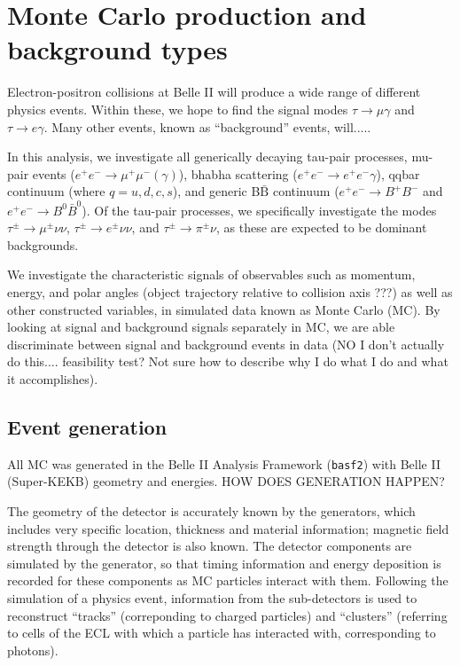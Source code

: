 \documentclass[12pt]{thesis}  %
\begin{document}

\chapter{Monte Carlo production and background types}

Electron-positron collisions at Belle II will produce a wide range of different physics events. Within these, we hope to find the signal modes $\tau\to\mu\gamma$ and $\tau\to e\gamma$. Many other events, known as ``background'' events, will.....

In this analysis, we investigate all generically decaying tau-pair processes, mu-pair events ($e^+ e^- \to \mu^+ \mu^- (\gamma)$), bhabha scattering ($e^+ e^- \to e^+ e^- \gamma$), qqbar continuum (where $q = u, d, c, s$), and generic B$\bar{\text{B}}$ continuum ($e^+ e^- \to B^+ B^-$ and $e^+ e^- \to B^0 \bar{B}^0$). Of the tau-pair processes, we specifically investigate the modes $\tau^{\pm} \to \mu^{\pm} \nu \nu$, $\tau^{\pm} \to e^{\pm} \nu \nu$, and $\tau^{\pm} \to \pi^{\pm} \nu$, as these are expected to be dominant backgrounds.

We investigate the characteristic signals of observables such as momentum, energy, and polar angles (object trajectory relative to collision axis ???) as well as other constructed variables, in simulated data known as Monte Carlo (MC). By looking at signal and background signals separately in MC, we are able discriminate between signal and background events in data (NO I don't actually do this.... feasibility test? Not sure how to describe why I do what I do and what it accomplishes).

\section{Event generation}

All MC was generated in the Belle II Analysis Framework (\texttt{basf2}) with Belle II (Super-KEKB) geometry and energies. HOW DOES GENERATION HAPPEN? 

The geometry of the detector is accurately known by the generators, which includes very specific location, thickness and material information; magnetic field strength through the detector is also known. The detector components are simulated by the generator, so that timing information and energy deposition is recorded for these components as MC particles interact with them. Following the simulation of a physics event, information from the sub-detectors is used to reconstruct ``tracks'' (correponding to charged particles) and ``clusters'' (referring to cells of the ECL with which a particle has interacted with, corresponding to photons).
\end{document}
